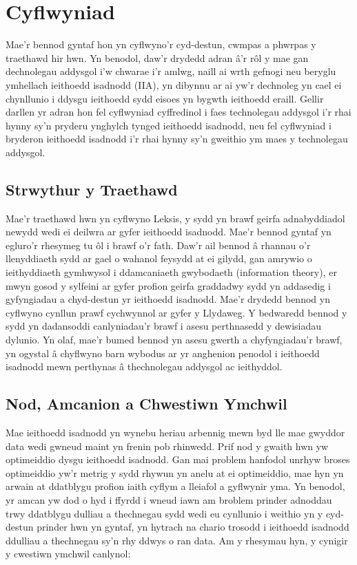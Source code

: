 \chapter{Cyflwyniad}    
Mae'r bennod gyntaf hon yn cyflwyno'r cyd-destun, cwmpas a phwrpas y traethawd hir hwn. Yn benodol, daw'r drydedd adran â'r rôl y mae gan dechnolegau addysgol i'w chwarae i'r amlwg, naill ai wrth gefnogi neu beryglu ymhellach ieithoedd isadnodd (IIA), yn dibynnu ar ai yw'r dechnoleg yn cael ei chynllunio i ddysgu ieithoedd sydd eisoes yn bygwth ieithoedd eraill. Gellir darllen yr adran hon fel cyflwyniad cyffredinol i faes technolegau addysgol i'r rhai hynny sy'n pryderu ynghylch tynged ieithoedd isadnodd, neu fel cyflwyniad i bryderon ieithoedd isadnodd i'r rhai hynny sy'n gweithio ym maes y technolegau addysgol.

\section{Strwythur y Traethawd}
Mae'r traethawd hwn yn cyflwyno Leksis, y sydd yn brawf geirfa adnabyddiadol newydd wedi ei deilwra ar gyfer ieithoedd isadnodd. Mae'r bennod gyntaf yn egluro'r rhesymeg tu ôl i brawf o'r fath. Daw'r ail bennod â rhannau o'r llenyddiaeth sydd ar gael o wahanol feysydd at ei gilydd, gan amrywio o ieithyddiaeth gymhwysol i ddamcaniaeth gwybodaeth (information theory), er mwyn gosod y sylfeini ar gyfer profion geirfa graddadwy sydd yn addasedig i gyfyngiadau a chyd-destun yr ieithoedd isadnodd. Mae'r drydedd bennod yn cyflwyno cynllun prawf cychwynnol ar gyfer y Llydaweg. Y bedwaredd bennod y sydd yn dadansoddi canlyniadau'r brawf i asesu perthnasedd y dewisiadau dylunio. Yn olaf, mae'r bumed bennod yn asesu gwerth a chyfyngiadau'r brawf, yn ogystal â chyflwyno barn wybodus ar yr anghenion penodol i ieithoedd isadnodd mewn perthynas â thechnolegau addysgol ac ieithyddol.

\section{Nod, Amcanion a Chwestiwn Ymchwil}
Mae ieithoedd isadnodd yn wynebu heriau arbennig mewn byd lle mae gwyddor data wedi gwneud maint yn frenin pob rhinwedd. Prif nod y gwaith hwn yw optimeiddio dysgu ieithoedd isadnodd. Gan mai problem hanfodol unrhyw broses optimeiddio yw'r metrig y sydd rhywun yn anelu at ei optimeiddio, mae hyn yn arwain at ddatblygu profion iaith cyflym a lleiafol a gyflwynir yma. Yn benodol, yr amcan yw dod o hyd i ffyrdd i wneud iawn am broblem prinder adnoddau trwy ddatblygu dulliau a thechnegau sydd wedi eu cynllunio i weithio yn y cyd-destun prinder hwn yn gyntaf, yn hytrach na chario trosodd i ieithoedd isadnodd ddulliau a thechnegau sy'n rhy ddwys o ran data. Am y rhesymau hyn, y cynigir y cwestiwn ymchwil canlynol:

